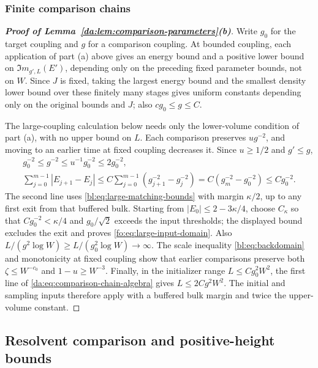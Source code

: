 \documentclass[11pt]{article}
\numberwithin{equation}{section}
\theoremstyle{remark}
\begin{document}
\subsubsection{Finite comparison chains}
\label{app:deterministic-iteration}
\begin{proof}[\textbf{Proof of Lemma~\ref{da:lem:comparison-parameters}(b)}]
Write $g_0$ for the target coupling and $g$ for a comparison coupling.
At bounded coupling, each application of part \textup{(a)} above
gives an energy bound and a positive lower bound on
$\Im m_{g',L}(E')$, depending only on the preceding fixed parameter
bounds, not on $W$. Since $J$ is fixed, taking the largest energy
bound and the smallest density lower bound over these finitely many
stages gives uniform constants depending only on the original bounds
and $J$; also $cg_0\le g\le C$.

The large-coupling calculation below needs only the lower-volume
condition of part \textup{(a)}, with no upper bound on $L$.
Each comparison preserves $ug^{-2}$, and moving to an earlier time
at fixed coupling decreases it. Since $u\ge1/2$ and $g'\le g$,
\begin{equation}\label{da:eq:comparison-chain-algebra}
 \begin{gathered}
 g_0^{-2}\le g^{-2}\le u^{-1}g_0^{-2}\le2g_0^{-2},\\
 \sum_{j=0}^{m-1}|E_{j+1}-E_j|
 \le C\sum_{j=0}^{m-1}(g_{j+1}^{-2}-g_j^{-2})
 =C(g_m^{-2}-g_0^{-2})\le Cg_0^{-2}.
 \end{gathered}
\end{equation}
The second line uses \eqref{bl:eq:large-matching-bounds} with margin
$\kappa/2$, up to any first exit from that buffered bulk.
Starting from $|E_0|\le2-3\kappa/4$, choose $C_\kappa$ so that
$Cg_0^{-2}<\kappa/4$ and $g_0/\sqrt2$ exceeds the input thresholds;
the displayed bound excludes the exit and proves
\eqref{fo:eq:large-input-domain}. Also
$L/(g^2\log W)\ge L/(g_0^2\log W)\to\infty$.
The scale inequality \eqref{bl:eq:backdomain} and monotonicity at
fixed coupling show that earlier comparisons preserve both
$\zeta\le W^{-c_0}$ and $1-u\ge W^{-3}$.
Finally, in the initializer range $L\le Cg_0^2W^2$, the first line of
\eqref{da:eq:comparison-chain-algebra} gives $L\le2Cg^2W^2$.
The initial and sampling inputs therefore apply with a buffered bulk
margin and twice the upper-volume constant.


\end{proof}

\subsection{Resolvent comparison and positive-height bounds}
\label{sec:bl-matching}
\end{document}
